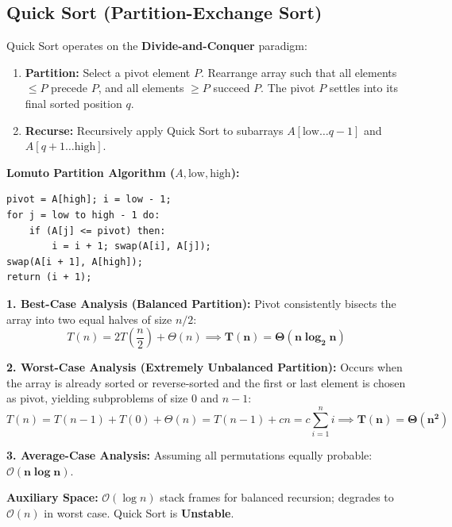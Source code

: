 \documentclass[12pt,a4paper]{article}
\begin{document}
\subsection{Quick Sort (Partition-Exchange Sort)}
\begin{tcolorbox}[defbox, title={\textbf{Quick Sort Principle and Partitioning Strategy}}]
Quick Sort operates on the \textbf{Divide-and-Conquer} paradigm:
\begin{enumerate}[leftmargin=*, nosep]
  \item \textbf{Partition:} Select a pivot element $P$. Rearrange array such that all elements $\le P$ precede $P$, and all elements $\ge P$ succeed $P$. The pivot $P$ settles into its final sorted position $q$.
  \item \textbf{Recurse:} Recursively apply Quick Sort to subarrays $A[\text{low} \dots q-1]$ and $A[q+1 \dots \text{high}]$.
\end{enumerate}
\par\vspace{2pt}\noindent
\textbf{Lomuto Partition Algorithm ($A, \text{low}, \text{high}$):}
\begin{verbatim}
pivot = A[high]; i = low - 1;
for j = low to high - 1 do:
    if (A[j] <= pivot) then:
        i = i + 1; swap(A[i], A[j]);
swap(A[i + 1], A[high]);
return (i + 1);
\end{verbatim}
\end{tcolorbox}

\begin{tcolorbox}[formulabox, title={\textbf{Quick Sort Recurrence Relations and Asymptotic Analysis}}]
\textbf{1. Best-Case Analysis (Balanced Partition):}
Pivot consistently bisects the array into two equal halves of size $n/2$:
\begin{equation}
  T(n) = 2 T\left(\frac{n}{2}\right) + \Theta(n) \implies \mathbf{T(n) = \Theta(n \log_2 n)}
\end{equation}

\textbf{2. Worst-Case Analysis (Extremely Unbalanced Partition):}
Occurs when the array is already sorted or reverse-sorted and the first or last element is chosen as pivot, yielding subproblems of size $0$ and $n-1$:
\begin{equation}
  T(n) = T(n - 1) + T(0) + \Theta(n) = T(n - 1) + c n = c \sum_{i=1}^n i \implies \mathbf{T(n) = \Theta(n^2)}
\end{equation}

\textbf{3. Average-Case Analysis:} Assuming all permutations equally probable: $\mathbf{\mathcal{O}(n \log n)}$.
\par\vspace{3pt}\noindent
\textbf{Auxiliary Space:} $\mathcal{O}(\log n)$ stack frames for balanced recursion; degrades to $\mathcal{O}(n)$ in worst case. Quick Sort is \textbf{Unstable}.
\end{tcolorbox}
\end{document}
